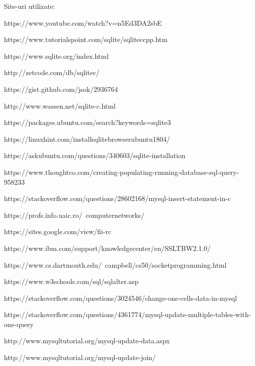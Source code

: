 \documentclass[a4paper]{article}
\begin{document}
Site-uri utilizate:

https://www.youtube.com/watch?v=n5Ed3DA2sbE

https://www.tutorialspoint.com/sqlite/sqliteccpp.htm

https://www.sqlite.org/index.html

http://zetcode.com/db/sqlitec/

https://gist.github.com/jsok/2936764

http://www.wassen.net/sqlite-c.html

https://packages.ubuntu.com/search?keywords=sqlite3

https://linuxhint.com/installsqlitebrowserubuntu1804/

https://askubuntu.com/questions/340603/sqlite-installation

https://www.thoughtco.com/creating-populating-running-database-sql-query-958233

https://stackoverflow.com/questions/28602168/mysql-insert-statement-in-c

https://profs.info.uaic.ro/~computernetworks/

https://sites.google.com/view/fii-rc

https://www.ibm.com/support/knowledgecenter/en/SSLTBW2.1.0/

https://www.cs.dartmouth.edu/~campbell/cs50/socketprogramming.html

https://www.w3schools.com/sql/sqlalter.asp

https://stackoverflow.com/questions/3024546/change-one-cells-data-in-mysql

https://stackoverflow.com/questions/4361774/mysql-update-multiple-tables-with-one-query

http://www.mysqltutorial.org/mysql-update-data.aspx

http://www.mysqltutorial.org/mysql-update-join/
\end{document}
